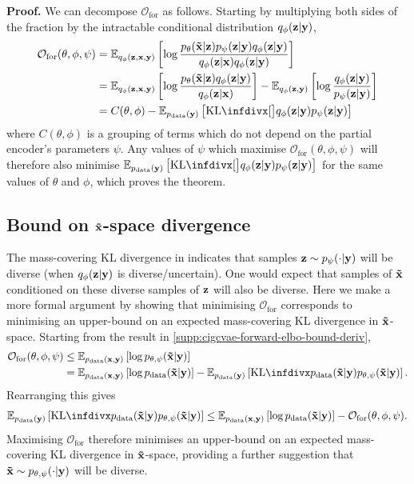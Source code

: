 \textbf{Proof.} We can decompose $\mathcal{O}_\mathrm{for}$ as follows.
Starting by multiplying both sides of the fraction by the intractable
conditional distribution $q_\phi({\mathbf{z}}|{\mathbf{y}})$,
\begin{align}
  \mathcal{O}_\mathrm{for}(\theta, \phi, \psi ) &= \EX_{q_\phi(\rvz,\rvx,\rvy)} \left[ \log \frac{p_\theta(\tildeI{}|\rvz)p_\psi(\rvz|\rvy)q_\phi(\rvz|\rvy)}{q_\phi(\rvz|\rvx)q_\phi(\rvz|\rvy)} \right]\\
                                                   &= \EX_{q_\phi(\rvz,\rvx,\rvy)} \left[ \log \frac{p_\theta(\tildeI{}|\rvz)q_\phi(\rvz|\rvy)}{q_\phi(\rvz|\rvx)} \right] - \EX_{q_\phi(\rvz,\rvy)} \left[ \log\frac{q_\phi(\rvz|\rvy)}{p_\psi(\rvz|\rvy)} \right] \\
                                                   &= C(\theta, \phi) - \EX_{\pdata (\rvy)} \left[ \kl[\big]{ q_\phi(\rvz|\rvy) }{ p_\psi(\rvz|\rvy) } \right]   \label{eq:constant-and-forward-kl}
\end{align}
where $C(\theta, \phi)$ is a grouping of terms which do not depend on the
partial encoder's parameters $\psi $. Any values of $\psi$ which
maximise $\mathcal{O}_\mathrm{for}(\theta, \phi, \psi)$ will therefore also
minimise $\EX_{\pdata (\rvy)} \left[ \kl[\big]{ q_\phi(\rvz|\rvy) }{p_\psi(\rvz|\rvy) } \right]$ for the same values of $\theta$ and $\phi$,
which proves the theorem.

\subsection{Bound on $\mathbf{\tilde{x}}{}$-space divergence}
The mass-covering KL divergence in  indicates that
samples ${\mathbf{z}}\sim p_\psi(\cdot|{\mathbf{y}})$ will be diverse (when $q_\phi({\mathbf{z}}|{\mathbf{y}})$ is
diverse/uncertain). One would expect that samples of $\mathbf{\tilde{x}}{}$ conditioned on these
diverse samples of ${\mathbf{z}}$ will also be diverse. Here we make a more formal argument
by showing that minimising $\mathcal{O}_\mathrm{for}$ corresponds to minimising
an upper-bound on an expected mass-covering KL divergence in $\mathbf{\tilde{x}}{}$-space.
Starting from the result in \cref{supp:cigcvae-forward-elbo-bound-deriv},
\begin{align}
  \mathcal{O}_\mathrm{for}(\theta, \phi, \psi ) &\leq \EX_{\pdata (\rvx,\rvy)} \left[ \log p_{\theta,\psi}(\tildeI{}|\rvy) \right] \\
                                                     &= \EX_{\pdata (\rvx,\rvy)} \left[ \log \pdata (\tildeI{}|\rvy) \right] - \EX_{\pdata (\rvy)}\left[ \kl{\pdata (\tildeI{}|\rvy)}{p_{\theta,\psi}(\tildeI{}|\rvy)} \right].
\end{align}
Rearranging this gives
\begin{align}
  \EX_{\pdata (\rvy)}\left[ \kl{\pdata (\tildeI{}|\rvy)}{p_{\theta,\psi}(\tildeI{}|\rvy)} \right]  \leq \EX_{\pdata (\rvx,\rvy)} \left[ \log \pdata (\tildeI{}|\rvy) \right] - \mathcal{O}_\mathrm{for}(\theta, \phi, \psi ).
\end{align}
Maximising $\mathcal{O}_\mathrm{for}$ therefore minimises an upper-bound on an
expected mass-covering KL divergence in $\mathbf{\tilde{x}}{}$-space, providing a further suggestion that
$\mathbf{\tilde{x}}{}\sim p_{\theta,\psi}(\cdot|{\mathbf{y}})$ will be diverse.

